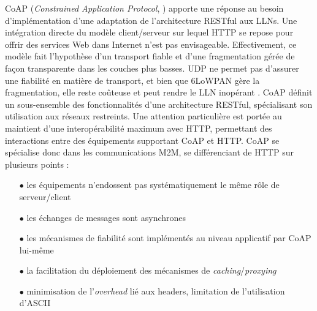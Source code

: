 \documentclass[]{report}
\begin{document}
CoAP (\textit{Constrained Application Protocol}, \cite{rfc7252}) apporte une réponse au besoin d'implémentation d'une adaptation de l'architecture RESTful aux LLNs. Une intégration directe du modèle client/serveur sur lequel HTTP se repose pour offrir des services Web dans Internet n'est pas envisageable. Effectivement, ce modèle fait l'hypothèse d'un transport fiable et d'une fragmentation gérée de façon transparente dans les couches plus basses. UDP ne permet pas d'assurer une fiabilité en matière de transport, et bien que 6LoWPAN gère la fragmentation, elle reste coûteuse et peut rendre le LLN inopérant \cite{stack-IoT}. CoAP définit un sous-ensemble des fonctionnalités d'une architecture RESTful, spécialisant son utilisation aux réseaux restreints. Une attention particulière est portée au maintient d'une interopérabilité maximum avec HTTP, permettant des interactions entre des équipements supportant CoAP et HTTP. CoAP se spécialise donc dans les communications M2M, se différenciant de HTTP sur plusieurs points :
\vspace{0.2cm}
\begin{itemize}
\item[$\bullet$] les équipements n'endossent pas systématiquement le même rôle de serveur/client
\vspace{0.1cm}
\item[$\bullet$] les échanges de messages sont asynchrones
\vspace{0.1cm}
\item[$\bullet$] les mécanismes de fiabilité sont implémentés au niveau applicatif par CoAP lui-même
\vspace{0.1cm}
\item[$\bullet$] la facilitation du déploiement des mécanismes de \textit{caching}/\textit{proxying}
\vspace{0.1cm}
\item[$\bullet$] minimisation de l'\textit{overhead} lié aux headers, limitation de l'utilisation d'ASCII
\end{itemize}

\vspace{0.6cm}
\end{document}
